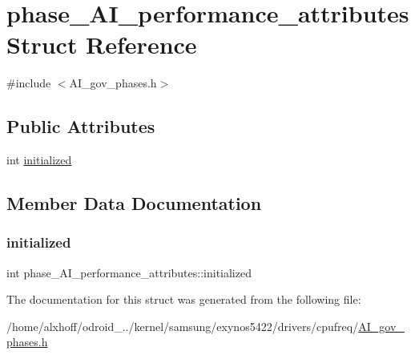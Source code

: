 \hypertarget{structphase__AI__performance__attributes}{}\section{phase\+\_\+\+A\+I\+\_\+performance\+\_\+attributes Struct Reference}
\label{structphase__AI__performance__attributes}


{\ttfamily \#include $<$A\+I\+\_\+gov\+\_\+phases.\+h$>$}

\subsection*{Public Attributes}
\begin{DoxyCompactItemize}
\item 
int \hyperlink{structphase__AI__performance__attributes_aba9be00eda0cb18473953ada1e754d64}{initialized}
\end{DoxyCompactItemize}


\subsection{Member Data Documentation}
\mbox{\label{structphase__AI__performance__attributes_aba9be00eda0cb18473953ada1e754d64}} 
\subsubsection{\texorpdfstring{initialized}{initialized}}
{\footnotesize\ttfamily int phase\+\_\+\+A\+I\+\_\+performance\+\_\+attributes\+::initialized}



The documentation for this struct was generated from the following file\+:\begin{DoxyCompactItemize}
\item 
/home/alxhoff/odroid\+\_../kernel/samsung/exynos5422/drivers/cpufreq/\hyperlink{AI__gov__phases_8h}{A\+I\+\_\+gov\+\_\+phases.\+h}\end{DoxyCompactItemize}
